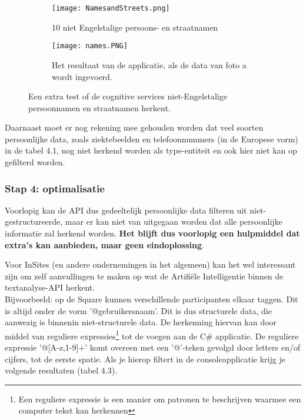 \begin{figure}[h]
    \centering
    \begin{subfigure}{0.45\textwidth}
        \centering
        \texttt{[image: NamesandStreets.png]}
        \caption{10 niet Engelstalige persoons- en straatnamen}
        \label{fig:namesandstreets}
    \end{subfigure}%
    \begin{subfigure}{0.45\textwidth}
        \centering
        \texttt{[image: names.PNG]}
        \caption{Het resultaat van de applicatie, als de data van foto a wordt ingevoerd.}
        \label{fig:names}
    \end{subfigure}
    \caption{Een extra test of de cognitive services niet-Engelstalige persoonnamen en straatnamen herkent.}
    \label{fig:extratest}
\end{figure}

Daarnaast moet er nog rekening mee gehouden worden dat veel soorten persoonlijke data, zoals ziektebeelden en telefoonnummers (in de Europese vorm) in de tabel 4.1, nog niet herkend worden als type-entiteit en ook hier niet kan op gefilterd worden. 

\subsubsection{Stap 4: optimalisatie}
	
Voorlopig kan de API dus gedeeltelijk persoonlijke data filteren uit niet-gestructureerde, maar er kan niet van uitgegaan worden dat alle persoonlijke informatie zal herkend worden. \textbf{Het blijft dus voorlopig een hulpmiddel dat extra's kan aanbieden, maar geen eindoplossing}. 

Voor InSites (en andere ondernemingen in het algemeen) kan het wel interessant zijn om zelf aanvullingen te maken op wat de Artifiële Intelligentie binnen de textanalyse-API herkent. \\

Bijvoorbeeld: op de Square kunnen verschillende participanten elkaar taggen. Dit is altijd onder de vorm '@gebruikersnaam'. Dit is dus structurele data, die aanwezig is binnenin niet-structurele data. De herkenning hiervan kan door middel van reguliere expressies\footnote{Een reguliere expressie is een manier om patronen te beschrijven waarmee een computer tekst kan herkennen} tot de voegen aan de C\# applicatie.
De reguliere expressie '@[A-z,1-9]+' komt overeen met een '@'-teken gevolgd door letters en/of cijfers, tot de eerste spatie. Als je hierop filtert in de consoleapplicatie krijg je volgende resultaten (tabel 4.3).

